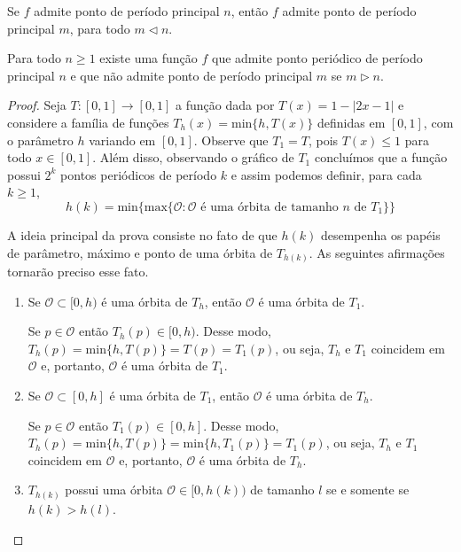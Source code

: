 \begin{theorem}[Sharkovsky]
Se $f$ admite ponto de período principal $n$, então $f$ admite ponto de período principal $m$, para todo $m \triangleleft n$.
\end{theorem}

\begin{theorem}
Para todo $n \geq 1$ existe uma função $f$ que admite ponto periódico de período principal $n$ e que não admite ponto de período principal $m$ se $m \triangleright n$.
\end{theorem}

\begin{proof}
Seja $T: [0,1] \to [0,1]$ a função dada por $T(x) = 1 - |2x - 1|$ e considere a família de funções $T_h(x) = \textrm{min}\{h, T(x)\}$ definidas em $[0,1]$, com o parâmetro $h$ variando em $[0,1]$. Observe que $T_1 = T$, pois $T(x) \leq 1$ para todo $x \in [0,1]$. Além disso, observando o gráfico de $T_1$ concluímos que a função possui $2^k$ pontos periódicos de período $k$ e assim podemos definir, para cada $k \geq 1$, $$h(k) = \textrm{min} \{ \textrm{max} \{ \mathcal{O} : \mathcal{O} \textrm{ é uma órbita de tamanho } n \textrm{ de } T_1\} \}$$

A ideia principal da prova consiste no fato de que $h(k)$ desempenha os papéis de parâmetro, máximo e ponto de uma órbita de $T_{h(k)}$. As seguintes afirmações tornarão preciso esse fato.

\begin{enumerate}[label = (\alph*)]
\item Se $\mathcal{O} \subset [0, h)$ é uma órbita de $T_h$, então $\mathcal{O}$ é uma órbita de $T_1$.

Se $p \in \mathcal{O}$ então $T_h(p) \in [0, h)$. Desse modo, $T_h(p) = \textrm{min}\{h, T(p)\} = T(p) = T_1(p)$, ou seja, $T_h$ e $T_1$ coincidem em $\mathcal{O}$ e, portanto, $\mathcal{O}$ é uma órbita de $T_1$.

\item Se $\mathcal{O} \subset [0, h]$ é uma órbita de $T_1$, então $\mathcal{O}$ é uma órbita de $T_h$.

Se $p \in \mathcal{O}$ então $T_1(p) \in [0, h]$. Desse modo, $T_h(p) = \textrm{min}\{h, T(p)\} = \textrm{min}\{h, T_1(p)\} = T_1(p)$, ou seja, $T_h$ e $T_1$ coincidem em $\mathcal{O}$ e, portanto, $\mathcal{O}$ é uma órbita de $T_h$.

\item $T_{h(k)}$ possui uma órbita $\mathcal{O} \in [0, h(k))$ de tamanho $l$ se e somente se $h(k) > h(l)$.


\end{enumerate}
\end{proof}

